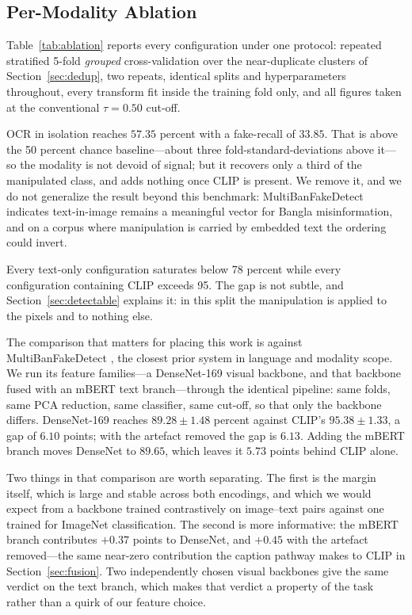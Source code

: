\documentclass[pdflatex,sn-mathphys-num]{sn-jnl}
\begin{document}
\subsection{Per-Modality Ablation}
\label{sec:ablation}

Table~\ref{tab:ablation} reports every configuration under one protocol:
repeated stratified 5-fold \emph{grouped} cross-validation over the
near-duplicate clusters of Section~\ref{sec:dedup}, two repeats, identical
splits and hyperparameters throughout, every transform fit inside the training
fold only, and all figures taken at the conventional $\tau = 0.50$ cut-off.

OCR in isolation reaches $57.35$ percent with a fake-recall of $33.85$. That is
above the 50 percent chance baseline---about three fold-standard-deviations
above it---so the modality is not devoid of signal; but it recovers only a
third of the manipulated class, and adds nothing once CLIP is present. We
remove it, and we do not generalize the result beyond this benchmark:
MultiBanFakeDetect \cite{multibanfake} indicates text-in-image remains a
meaningful vector for Bangla misinformation, and on a corpus where
manipulation is carried by embedded text the ordering could invert.

Every text-only configuration saturates below 78 percent while every
configuration containing CLIP exceeds 95. The gap is not subtle, and
Section~\ref{sec:detectable} explains it: in this split the manipulation is
applied to the pixels and to nothing else.

The comparison that matters for placing this work is against
MultiBanFakeDetect \cite{multibanfake}, the closest prior system in language
and modality scope. We run its feature families---a DenseNet-169 visual
backbone, and that backbone fused with an mBERT text branch---through the
identical pipeline: same folds, same PCA reduction, same classifier, same
cut-off, so that only the backbone differs. DenseNet-169 reaches
$89.28 \pm 1.48$ percent against CLIP's $95.38 \pm 1.33$, a gap of $6.10$
points; with the artefact removed the gap is $6.13$. Adding the mBERT branch
moves DenseNet to $89.65$, which leaves it $5.73$ points behind CLIP alone.

Two things in that comparison are worth separating. The first is the margin
itself, which is large and stable across both encodings, and which we would
expect from a backbone trained contrastively on image--text pairs against one
trained for ImageNet classification. The second is more informative: the mBERT
branch contributes $+0.37$ points to DenseNet, and $+0.45$ with the artefact
removed---the same near-zero contribution the caption pathway makes to CLIP in
Section~\ref{sec:fusion}. Two independently chosen visual backbones give the
same verdict on the text branch, which makes that verdict a property of the
task rather than a quirk of our feature choice.
\end{document}
